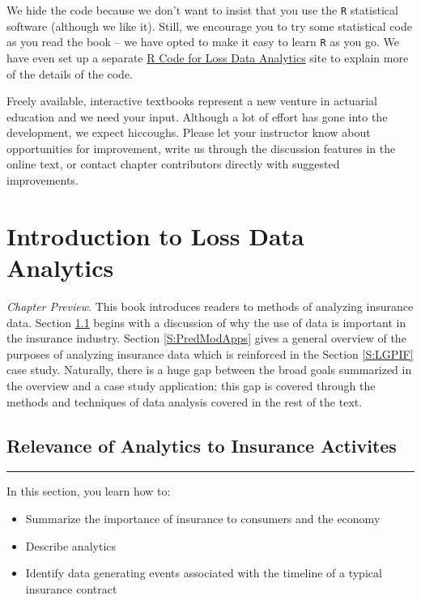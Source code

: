 \documentclass[]{book}
\providecommand{\tightlist}{%
  \setlength{\itemsep}{0pt}\setlength{\parskip}{0pt}}
\theoremstyle{definition}
\theoremstyle{definition}
\theoremstyle{definition}
\theoremstyle{remark}
\begin{document}
We hide the code because we don't want to insist that you use the
\texttt{R} statistical software (although we like it). Still, we
encourage you to try some statistical code as you read the book -- we
have opted to make it easy to learn \texttt{R} as you go. We have even
set up a separate \href{https://openacttexts.github.io/LDARcode}{R Code
for Loss Data Analytics} site to explain more of the details of the
code.

Freely available, interactive textbooks represent a new venture in
actuarial education and we need your input. Although a lot of effort has
gone into the development, we expect hiccoughs. Please let your
instructor know about opportunities for improvement, write us through
the discussion features in the online text, or contact chapter
contributors directly with suggested improvements.

\chapter{Introduction to Loss Data Analytics}\label{C:Intro}

\emph{Chapter Preview}. This book introduces readers to methods of
analyzing insurance data. Section \ref{S:Intro} begins with a discussion
of why the use of data is important in the insurance industry. Section
\ref{S:PredModApps} gives a general overview of the purposes of
analyzing insurance data which is reinforced in the Section
\ref{S:LGPIF} case study. Naturally, there is a huge gap between the
broad goals summarized in the overview and a case study application;
this gap is covered through the methods and techniques of data analysis
covered in the rest of the text.

\section{Relevance of Analytics to Insurance Activites}\label{S:Intro}

\begin{center}\rule{0.5\linewidth}{\linethickness}\end{center}

In this section, you learn how to:

\begin{itemize}
\tightlist
\item
  Summarize the importance of insurance to consumers and the economy
\item
  Describe analytics
\item
  Identify data generating events associated with the timeline of a
  typical insurance contract
\end{itemize}
\end{document}
